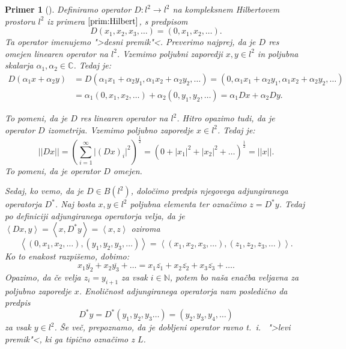 \documentclass[12pt,a4paper,oneside,fleqn,openany]{book}
\newtheorem{primer*}[izrek]{Primer}
\newenvironment{primer}[1][]{\begin{primer*}[#1]\renewcommand*{\qedsymbol}{$\diamondsuit$}\pushQED{\qed}}{\popQED\end{primer*}}
\newcommand{\N}{\mathbb{N}}
\newcommand{\C}{\mathbb{C}}
\newcommand{\abs}[1]{\ensuremath{\lvert #1 \rvert}}
\newcommand{\norm}[1]{\abs{\abs{#1}}}
\newcommand{\Sp}[2]{\ensuremath{\left<#1, #2\right>}}
\newcommand{\map}[3]{\ensuremath{{#1}:{#2}\rightarrow{#3}}}
\begin{document}
\begin{primer}
	\label{prim:adjop1} Definiramo operator $\map{D}{l^2}{l^2}$ na kompleksnem Hilbertovem prostoru $l^2$ iz primera $\ref{prim:Hilbert}$, s predpisom $$D(x_1, x_2, x_3, \ldots) = (0, x_1, x_2, \ldots).$$ Ta operator imenujemo ">desni premik"<. Preverimo najprej, da je $D$ res omejen linearen operator na $l^2$. Vzemimo poljubni zaporedji $x, y\in l^2$ in poljubna skalarja $\alpha_1, \alpha_2\in\C$. Tedaj je: \begin{align*}
		D(\alpha_1 x + \alpha_2 y) &= D(\alpha_1 x_1 + \alpha_2 y_1 , \alpha_1 x_2 + \alpha_2 y_2, \ldots) = (0, \alpha_1 x_1 + \alpha_2 y_1 , \alpha_1 x_2 + \alpha_2 y_2, \ldots) \\ &= \alpha_1(0, x_1, x_2, \ldots) + \alpha_2(0, y_1, y_2, \ldots) = \alpha_1 Dx + \alpha_2 Dy.
	\end{align*}
	
	To pomeni, da je $D$ res linearen operator na $l^2$. Hitro opazimo tudi, da je operator $D$ izometrija. Vzemimo poljubno zaporedje $x\in l^2$. Tedaj je: $$\norm{Dx} = \left(\sum_{i = 1}^{\infty}\abs{(Dx)_i}^2\right)^{\frac{1}{2}}=\left(0 + \abs{x_1}^2 + \abs{x_2}^2 +\ldots \right)^{\frac{1}{2}}=\norm{x}.$$
	To pomeni, da je operator $D$ omejen.
	
	Sedaj, ko vemo, da je $D\in B(l^2)$, določimo predpis njegovega adjungiranega operatorja $D^*$. Naj bosta $x, y\in l^2$ poljubna elementa ter označimo $z = D^*y$. Tedaj po definiciji adjungiranega operatorja velja, da je $\Sp{Dx}{y} = \Sp{x}{D^*y} = \Sp{x}{z}$ oziroma $$\Sp{(0, x_1, x_2, \ldots)}{(y_1, y_2, y_3, \ldots)}=\Sp{(x_1, x_2, x_3, \ldots)}{(z_1, z_2, z_3, \ldots)}.$$
	Ko to enakost razpišemo, dobimo: $$x_1\overline{y_2}+x_2\overline{y_3} + \ldots = x_1\overline{z_1} + x_2\overline{z_2}+x_3\overline{z_3} + \ldots.$$
	Opazimo, da če velja $z_i = y_{i+1}$ za vsak $i\in \N$, potem bo naša enačba veljavna za poljubno zaporedje $x$. Enoličnost adjungiranega operatorja nam posledično da predpis $$D^*y = D^*(y_1, y_2, y_3 \ldots) = (y_2, y_3, y_4, \ldots)$$ za vsak $y\in l^2$. Še več, prepoznamo, da je dobljeni operator ravno t.~i.~ ">levi premik"<, ki ga tipično označimo z $L$.
\end{primer}
\end{document}
